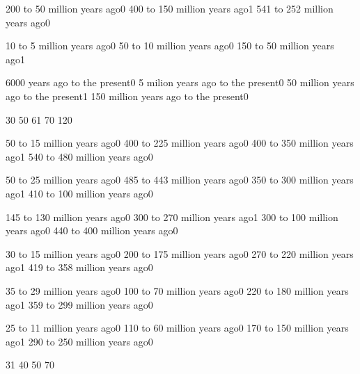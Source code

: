 {200 to 50 million years ago}{0}
{400 to 150 million years ago}{1}
{541 to 252 million years ago}{0}
\qstop

{10 to 5 million years ago}{0}
{50 to 10 million years ago}{0}
{150 to 50 million years ago}{1}
\qstop

{6000 years ago to the present}{0}
{5 milion years ago to the present}{0}
{50 million years ago to the present}{1}
{150 million years ago to the present}{0}
\qstop

{3}{0}
{5}{0}
{6}{1}
{7}{0}
{12}{0}
\qstop

{50 to 15 million years ago}{0}
{400 to 225 million years ago}{0}
{400 to 350 million years ago}{1}
{540 to 480 million years ago}{0}
\qstop

{50 to 25 million years ago}{0}
{485 to 443 million years ago}{0}
{350 to 300 million years ago}{1}
{410 to 100 million years ago}{0}
\qstop

{145 to 130 million years ago}{0}
{300 to 270 million years ago}{1}
{300 to 100 million years ago}{0}
{440 to 400 million years ago}{0}
\qstop

{30 to 15 million years ago}{0}
{200 to 175 million years ago}{0}
{270 to 220 million years ago}{1}
{419 to 358 million years ago}{0}
\qstop

{35 to 29 million years ago}{0}
{100 to 70 million years ago}{0}
{220 to 180 million years ago}{1}
{359 to 299 million years ago}{0}
\qstop

{25 to 11 million years ago}{0}
{110 to 60 million years ago}{0}
{170 to 150 million years ago}{1}
{290 to 250 million years ago}{0}
\qstop

{3}{1}
{4}{0}
{5}{0}
{7}{0}
\qstop

